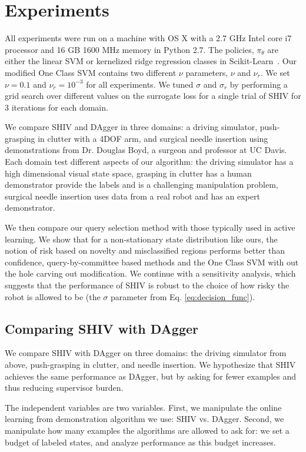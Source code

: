 \documentclass[10pt, conference]{ieeeconf}      %
\begin{document}
\section{Experiments}

All experiments were run on a machine with OS X with a 2.7 GHz Intel core i7 processor and 16 GB
1600 MHz memory in Python 2.7. The policies, $\pi_\theta$ are either the linear SVM or  kernelized ridge regression classes in Scikit-Learn~\cite{scikit-learn}. Our modified One Class SVM contains two different $\nu$ parameters, $\nu$ and $\nu_r$. We set $\nu = 0.1$ and $\nu_r =10^{-3}$ for all experiments. We tuned $\sigma$ and $\sigma_r$ by performing a grid search over different values on the surrogate loss for a single trial of SHIV for 3 iterations for each domain.

We compare SHIV and DAgger in three domains: a driving simulator, push-grasping in clutter with a 4DOF arm, and surgical needle insertion using demonstrations from Dr. Douglas Boyd, a surgeon and professor at UC Davis. Each domain test different aspects of our algorithm: the driving simulator has a high dimensional visual state space, grasping in clutter has a human demonstrator provide the labels and is a challenging manipulation problem, surgical needle insertion uses data from a real robot and has an expert demonstrator. 

We then  compare our query selection method with those typically used in active learning. We show that for a non-stationary state distribution like ours, the notion of risk based on novelty and misclassified regions performs better than confidence, query-by-committee based methods and the One Class SVM with out the hole carving out modification. We continue with a sensitivity analysis, which suggests that the performance of SHIV is robust to the choice of how risky the robot is allowed to be (the $\sigma$ parameter from Eq. \ref{eq:decision_func}).




\subsection{Comparing SHIV with DAgger}
We compare SHIV with DAgger on three domains: the driving simulator from above, push-grasping in clutter, and needle insertion. We hypothesize that SHIV achieves the same performance as DAgger, but by asking for fewer examples and thus reducing supervisor burden.

The independent variables are two variables. First, we manipulate the online learning from demonstration algorithm we use: SHIV vs. DAgger. Second, we manipulate how many examples the algorithms are allowed to ask for: we set a budget of labeled states, and analyze performance as this budget increases.
\end{document}
